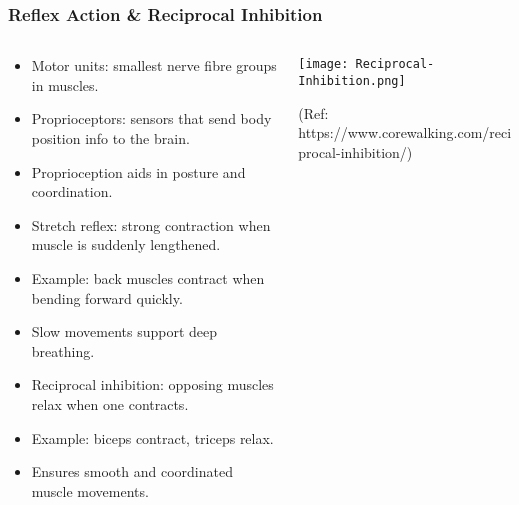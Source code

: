 \begin{frame}[fragile]\frametitle{Reflex Action \& Reciprocal Inhibition}
\begin{columns}
    \begin{column}[T]{0.5\linewidth}
      \begin{itemize}
		\item Motor units: smallest nerve fibre groups in muscles.
		\item Proprioceptors: sensors that send body position info to the brain.
		\item Proprioception aids in posture and coordination.
		\item Stretch reflex: strong contraction when muscle is suddenly lengthened.
		\item Example: back muscles contract when bending forward quickly.
		\item Slow movements support deep breathing.
		\item Reciprocal inhibition: opposing muscles relax when one contracts.
		\item Example: biceps contract, triceps relax.
		\item Ensures smooth and coordinated muscle movements.
	  \end{itemize}
    \end{column}
    \begin{column}[T]{0.5\linewidth}
		\begin{center}
		\texttt{[image: Reciprocal-Inhibition.png]}
		
						
		{\tiny (Ref: https://www.corewalking.com/reciprocal-inhibition/)}
		\end{center}	
    \end{column}
  \end{columns}
\end{frame}

